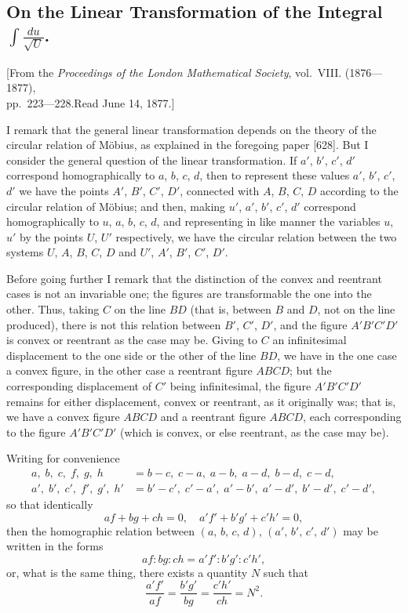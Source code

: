 \documentclass[12pt,a4paper]{article}
\begin{document}
\subsection*{On the Linear Transformation of the Integral $\displaystyle\int\!\frac{du}{\surd U}$.}

\begin{center}
\small
[From the \textit{Proceedings of the London Mathematical Society}, vol.~VIII. (1876---1877),\\
pp.~223---228.\quad Read June 14, 1877.]
\end{center}

\medskip
\noindent
I remark that the general linear transformation depends on the theory of the circular relation of M\"obius, as explained in the foregoing paper [628]. But I consider the general question of the linear transformation. If $a'$, $b'$, $c'$, $d'$ correspond homographically to $a$, $b$, $c$, $d$, then to represent these values $a'$, $b'$, $c'$, $d'$ we have the points $A'$, $B'$, $C'$, $D'$, connected with $A$, $B$, $C$, $D$ according to the circular relation of M\"obius; and then, making $u'$, $a'$, $b'$, $c'$, $d'$ correspond homographically to $u$, $a$, $b$, $c$, $d$, and representing in like manner the variables $u$, $u'$ by the points $U$, $U'$ respectively, we have the circular relation between the two systems $U$, $A$, $B$, $C$, $D$ and $U'$, $A'$, $B'$, $C'$, $D'$.

Before going further I remark that the distinction of the convex and reentrant cases is not an invariable one; the figures are transformable the one into the other. Thus, taking $C$ on the line $BD$ (that is, between $B$ and $D$, not on the line produced), there is not this relation between $B'$, $C'$, $D'$, and the figure $A'B'C'D'$ is convex or reentrant as the case may be. Giving to $C$ an infinitesimal displacement to the one side or the other of the line $BD$, we have in the one case a convex figure, in the other case a reentrant figure $ABCD$; but the corresponding displacement of $C'$ being infinitesimal, the figure $A'B'C'D'$ remains for either displacement, convex or reentrant, as it originally was; that is, we have a convex figure $ABCD$ and a reentrant figure $ABCD$, each corresponding to the figure $A'B'C'D'$ (which is convex, or else reentrant, as the case may be).

Writing for convenience
\begin{align*}
a,\; b,\; c,\; f,\; g,\; h &= b-c,\; c-a,\; a-b,\; a-d,\; b-d,\; c-d, \\
a',\; b',\; c',\; f',\; g',\; h' &= b'-c',\; c'-a',\; a'-b',\; a'-d',\; b'-d',\; c'-d',
\end{align*}
so that identically
\[
af + bg + ch = 0, \quad a'f' + b'g' + c'h' = 0,
\]
then the homographic relation between $(a,\,b,\,c,\,d)$, $(a',\,b',\,c',\,d')$ may be written in the forms
\[
af : bg : ch = a'f' : b'g' : c'h',
\]
or, what is the same thing, there exists a quantity $N$ such that
\[
\frac{a'f'}{af} = \frac{b'g'}{bg} = \frac{c'h'}{ch} = N^2.
\]
\end{document}
